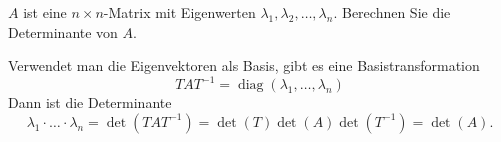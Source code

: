 $A$ ist eine $n\times n$-Matrix mit Eigenwerten
$\lambda_1,\lambda_2,\dots,\lambda_n$.
Berechnen Sie die Determinante von $A$.

\begin{loesung}
Verwendet man die Eigenvektoren als Basis, gibt es eine Basistransformation
\[
TAT^{-1}=\operatorname{diag}(\lambda_1,\dots,\lambda_n)
\]
Dann ist die Determinante
\[
\lambda_1\cdot \dots\cdot\lambda_n
=
\det(TAT^{-1})
=
\det(T)\det(A)\det(T^{-1})
=
\det(A).
\]
\end{loesung}
